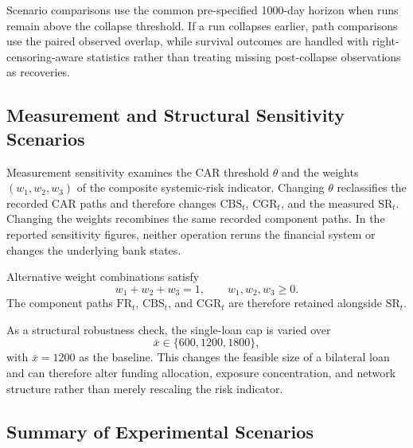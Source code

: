 Scenario comparisons use the common pre-specified 1000-day horizon when
runs remain above the collapse threshold. If a run collapses earlier,
path comparisons use the paired observed overlap, while survival outcomes
are handled with right-censoring-aware statistics rather than treating
missing post-collapse observations as recoveries.

\subsection{Measurement and Structural Sensitivity Scenarios}

Measurement sensitivity examines the CAR threshold \(\theta\) and the
weights \((w_1,w_2,w_3)\) of the composite systemic-risk indicator.
Changing \(\theta\) reclassifies the recorded CAR paths and therefore
changes \(\mathrm{CBS}_t\), \(\mathrm{CGR}_t\), and the measured
\(\mathrm{SR}_t\). Changing the weights recombines the same recorded
component paths. In the reported sensitivity figures, neither operation
reruns the financial system or changes the underlying bank states.

Alternative weight combinations satisfy
\begin{equation}
w_1+w_2+w_3=1,\qquad w_1,w_2,w_3\geq0.
\end{equation}
The component paths \(\mathrm{FR}_t\), \(\mathrm{CBS}_t\), and
\(\mathrm{CGR}_t\) are therefore retained alongside \(\mathrm{SR}_t\).

As a structural robustness check, the single-loan cap is varied over
\begin{equation}
\bar{x}\in\{600,1200,1800\},
\end{equation}
\vspace{-0.4\baselineskip}
\noindent
with \(\bar{x}=1200\) as the baseline. This changes the feasible size of
a bilateral loan and can therefore alter funding allocation, exposure
concentration, and network structure rather than merely rescaling the
risk indicator.

\subsection{Summary of Experimental Scenarios}

